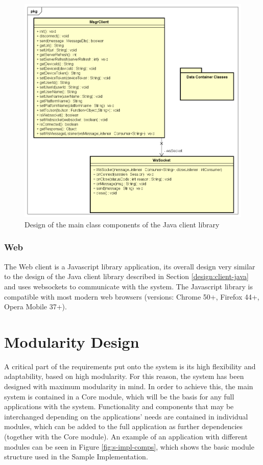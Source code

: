 \begin{figure}[H]
	\centering
	\includegraphics[width=1\textwidth]{figures/03_design/java-client-classes}
    \caption{Design of the main class components of the Java client library}
    \label{fig:java-client-classes}
\end{figure}

\subsubsection*{Web}
The Web client is a Javascript library application, its overall design very similar to the design of the Java client library described in Section \ref{design:client-java}  and uses websockets to communicate with the system. The Javascript library is compatible with most modern web browsers (versions: Chrome 50+, Firefox 44+, Opera Mobile 37+)\cite{fcm-web-client}.

\section{Modularity Design}

A critical part of the requirements put onto the system is its high flexibility and adaptability, based on high modularity. For this reason, the system has been designed with maximum modularity in mind. In order to achieve this, the main system is contained in a Core module, which will be the basis for any full applications with the system. Functionality and components that may be interchanged depending on the applications' needs are contained in individual modules, which can be added to the full application as further dependencies (together with the Core module). An example of an application with different modules can be seen in Figure \ref{fig:s-impl-comps}, which shows the basic module structure used in the Sample Implementation.

